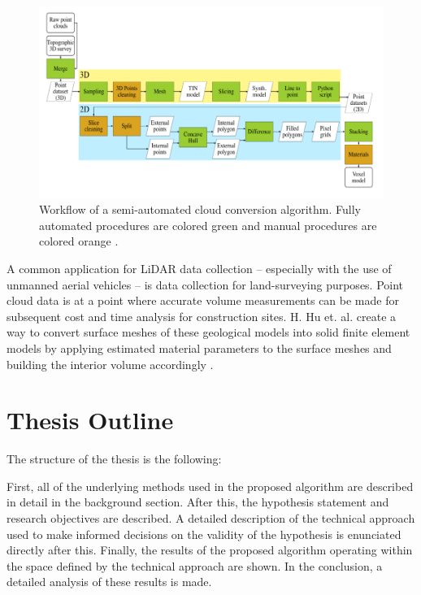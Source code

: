 \documentclass[12pt]{drexelthesis}
\let\Oldsection\section
\renewcommand{\section}{\FloatBarrier\Oldsection}
\begin{document}
\begin{figure}
	\centering
	\includegraphics[width=5in]{introduction/cloud2femworkflow.png}
	\caption[Workflow of a semi-automated cloud conversion algorithm]{\centering Workflow of a semi-automated cloud conversion algorithm. Fully automated procedures are colored green and manual procedures are colored orange \cite{RN29}.}
	\label{fig:cloud2femworkflow}
\end{figure}



A common application for LiDAR data collection -- especially with the use of unmanned aerial vehicles -- is data collection for land-surveying purposes. Point cloud data is at a point where accurate volume measurements can be made for subsequent cost and time analysis for construction sites. H. Hu et. al. create a way to convert surface meshes of these geological models into solid finite element models by applying estimated material parameters to the surface meshes and building the interior volume accordingly \cite{RN38}.



\section{Thesis Outline}

The structure of the thesis is the following:

First, all of the underlying methods used in the proposed algorithm are described in detail in the background section. After this, the hypothesis statement and research objectives are described. A detailed description of the technical approach used to make informed decisions on the validity of the hypothesis is enunciated directly after this. Finally, the results of the proposed algorithm operating within the space defined by the technical approach are shown. In the conclusion, a detailed analysis of these results is made.
\end{document}
